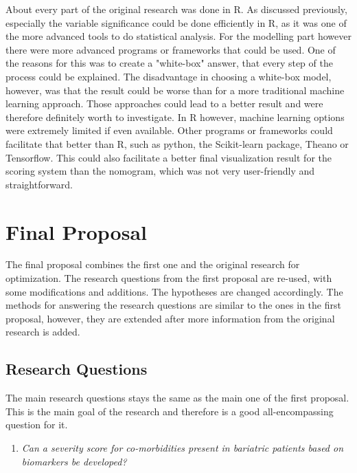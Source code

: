 \documentclass[10pt,a4paper]{article}
\begin{document}
	About every part of the original research was done in R. As discussed previously, especially the variable significance could be done efficiently in R, as it was one of the more advanced tools to do statistical analysis. For the modelling part however there were more advanced programs or frameworks that could be used. One of the reasons for this was to create a "white-box" answer, that every step of the process could be explained. The disadvantage in choosing a white-box model, however, was that the result could be worse than for a more traditional machine learning approach. Those approaches could lead to a better result and were therefore definitely worth to investigate. In R however, machine learning options were extremely limited if even available. Other programs or frameworks could facilitate that better than R, such as python, the Scikit-learn package, Theano or Tensorflow. This could also facilitate a better final visualization result for the scoring system than the nomogram, which was not very user-friendly and straightforward.
	
	\clearpage
	
	\section{Final Proposal}
	\label{sec:FinalProposal}
	
	The final proposal combines the first one and the original research for optimization. The research questions from the first proposal are re-used, with some modifications and additions. The hypotheses are changed accordingly. The methods for answering the research questions are similar to the ones in the first proposal, however, they are extended after more information from the original research is added. 
	
	\subsection{Research Questions}
	
	The main research questions stays the same as the main one of the first proposal. This is the main goal of the research and therefore is a good all-encompassing question for it. 
	
	\begin{enumerate}
		\item[] \emph{Can a severity score for co-morbidities present in bariatric patients based on biomarkers be developed?}
	\end{enumerate}
	
\end{document}
